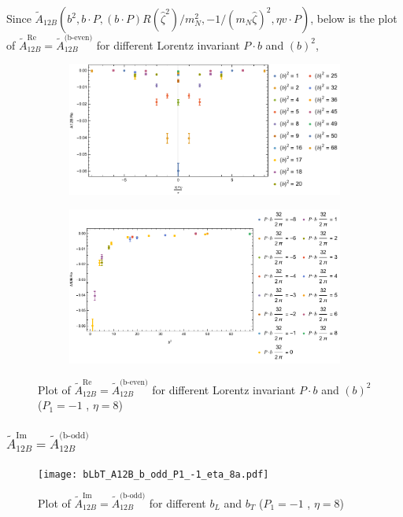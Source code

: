 \documentclass[]{article}
\numberwithin{equation}{section}
\newcommand{\tcdot}{{\cdot}}
\newcommand{\tAmp}{\widetilde{A}}
\newcommand{\tAmp}{\ensuremath{\widetilde{A}^{(+)}}}
\newcommand{\bvec}{b}
\newcommand{\mN}{m_N}
\newcommand{\zetahat}{{\hat \zeta}}
\begin{document}
Since $\tAmp_{12B}(\bvec^2,\bvec \tcdot P,(\bvec \tcdot P) R(\zetahat^2)/\mN^2,-1/(\mN\zetahat)^2,\eta v \tcdot P)$, below is the plot of $\tAmp^{\text{Re}}_{12B}=\tAmp^{\text{(b-even)}}_{12B}$ for different Lorentz invariant $P\cdot b$ and $(b)^2$,
\begin{figure}[h!]
     \centering
     \begin{subfigure}[b]{0.45\textwidth}
         \centering
         \includegraphics[width=\textwidth]{bP_A12B_b_even_P1_-1_eta_8a.pdf}
     \end{subfigure}
     \begin{subfigure}[b]{0.45\textwidth}
         \centering
         \includegraphics[width=\textwidth]{bsq_A12B_b_even_P1_-1_eta_8a.pdf}
     \end{subfigure}
        \caption{Plot of $\tAmp^{\text{Re}}_{12B}=\tAmp^{\text{(b-even)}}_{12B}$ for different Lorentz invariant $P\cdot b$ and $(b)^2$  ($P_{1} = -1$ , $\eta=8$)}
\end{figure}


\subsubsection{$\tAmp^{\text{Im}}_{12B}=\tAmp^{\text{(b-odd)}}_{12B}$}
\begin{figure}[h!]
    \centering
    \texttt{[image: bLbT\_A12B\_b\_odd\_P1\_-1\_eta\_8a.pdf]}
    \caption{Plot of  $\tAmp^{\text{Im}}_{12B}=\tAmp^{\text{(b-odd)}}_{12B}$ for different $b_{L}$ and $b_{T}$  ($P_{1} = -1$ , $\eta=8$)}
\end{figure}
\end{document}
